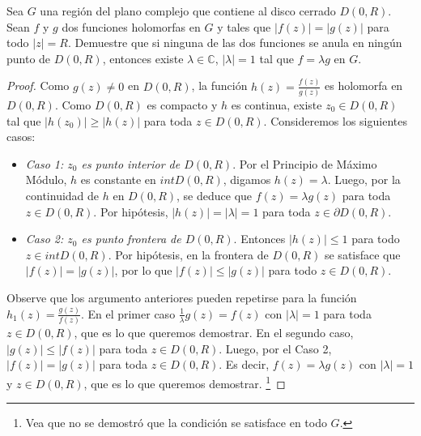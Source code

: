 \documentclass[12pt]{article}
\newcommand{\C}{\mathbb{C}}
\newenvironment{problem}[2][Problema]{\begin{trivlist}
\item[\hskip \labelsep {\bfseries #1}\hskip \labelsep {\bfseries #2.}]}{\end{trivlist}}
\begin{document}
\begin{problem}{4}
Sea $G$ una región del plano complejo que contiene al disco cerrado $D(0, R).$ Sean $f$ y $g$ dos funciones holomorfas en $G$ y tales que $\lvert f(z) \rvert = \lvert g(z) \rvert$ para todo $\lvert z \rvert = R$. Demuestre que si ninguna de las dos funciones se anula en ningún punto de $D(0, R)$, entonces existe $\lambda \in \C$, $\lvert \lambda \rvert = 1$ tal que $f = \lambda g$ en $G.$
\end{problem}
\begin{proof}
Como $g(z) \neq 0$ en $D(0, R)$, la función $h(z) = \frac{f(z)}{g(z)}$ es holomorfa en $D(0, R).$ Como $D(0, R)$ es compacto y $h$ es continua, existe $z_0 \in D(0, R)$ tal que $\lvert h(z_0) \rvert \geq \lvert h(z) \rvert $ para toda $z \in D(0, R).$ Consideremos los siguientes casos:
\begin{itemize}
    \item \textit{Caso 1:  $z_0 $ es punto interior de $D(0, R)$}. Por el Principio de Máximo Módulo, $h$ es constante en $int D(0, R)$, digamos $h(z) = \lambda$. Luego, por la continuidad de $h$ en $D(0, R)$, se deduce que $f(z) = \lambda g(z)$ para toda $z \in D(0, R).$ Por hipótesis, $\lvert h(z) \rvert = \lvert \lambda \rvert = 1$ para toda $z \in \partial D(0, R)$.
    
    \item \textit{Caso 2: $z_0$ es punto frontera de $D(0, R)$}. Entonces $\lvert h(z) \rvert  \leq 1$ para todo $z \in int D(0, R).$ Por hipótesis, en la frontera de $D(0, R)$ se satisface que $\lvert f(z) \rvert = \lvert g(z) \rvert$, por lo que $\lvert f(z) \rvert \leq \lvert g(z) \rvert$ para todo $z \in D(0, R).$
\end{itemize}

Observe que los argumento anteriores pueden repetirse para la función $h_1 (z) = \frac{g(z)}{f(z)}$. En el primer caso $\frac{1}{\lambda} g(z) = f(z)$ con $\lvert \lambda \rvert = 1$ para toda $z \in D(0, R)$, que es lo que queremos demostrar. En el segundo caso, $\lvert g(z) \rvert \leq \lvert f(z) \rvert$ para toda $z \in D(0, R).$ Luego, por el Caso 2, $\lvert f(z) \lvert  = \lvert g(z) \rvert $ para toda $z \in D(0, R).$ Es decir, $f(z) = \lambda g(z)$ con $\lvert \lambda \rvert = 1$ y $z\in D(0, R)$, que es lo que queremos demostrar. \footnote{Vea que no se demostró que la condición se satisface en todo $G$.}

\end{proof}
\end{document}
